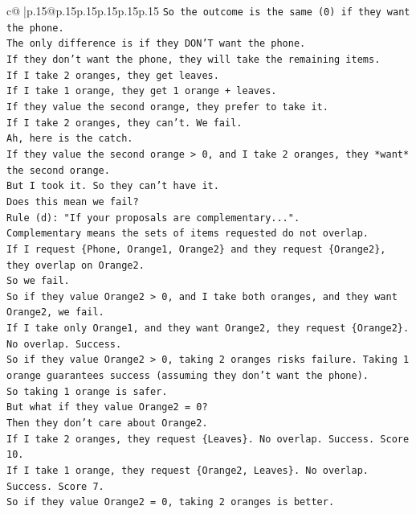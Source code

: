 \documentclass{article}
\begin{document}
{\begin{supertabular}{c@{$\;$}|p{.15\linewidth}@{}p{.15\linewidth}p{.15\linewidth}p{.15\linewidth}p{.15\linewidth}p{.15\linewidth}}
{{{\texttt{So the outcome is the same (0) if they want the phone.} \\
\texttt{The only difference is if they DON'T want the phone.} \\
\texttt{If they don't want the phone, they will take the remaining items.} \\
\texttt{If I take 2 oranges, they get leaves.} \\
\texttt{If I take 1 orange, they get 1 orange + leaves.} \\
\texttt{If they value the second orange, they prefer to take it.} \\
\texttt{If I take 2 oranges, they can't. We fail.} \\
\texttt{Ah, here is the catch.} \\
\texttt{If they value the second orange > 0, and I take 2 oranges, they *want* the second orange.} \\
\texttt{But I took it. So they can't have it.} \\
\texttt{Does this mean we fail?} \\
\texttt{Rule (d): "If your proposals are complementary...".} \\
\texttt{Complementary means the sets of items requested do not overlap.} \\
\texttt{If I request \{Phone, Orange1, Orange2\} and they request \{Orange2\}, they overlap on Orange2.} \\
\texttt{So we fail.} \\
\texttt{So if they value Orange2 > 0, and I take both oranges, and they want Orange2, we fail.} \\
\texttt{If I take only Orange1, and they want Orange2, they request \{Orange2\}. No overlap. Success.} \\
\texttt{So if they value Orange2 > 0, taking 2 oranges risks failure. Taking 1 orange guarantees success (assuming they don't want the phone).} \\
\texttt{So taking 1 orange is safer.} \\
\texttt{But what if they value Orange2 = 0?} \\
\texttt{Then they don't care about Orange2.} \\
\texttt{If I take 2 oranges, they request \{Leaves\}. No overlap. Success. Score 10.} \\
\texttt{If I take 1 orange, they request \{Orange2, Leaves\}. No overlap. Success. Score 7.} \\
\texttt{So if they value Orange2 = 0, taking 2 oranges is better.} \\
}}}
\end{supertabular}}
\end{document}
